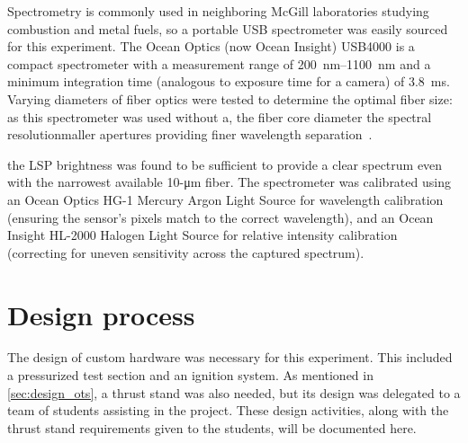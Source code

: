                 Spectrometry is commonly used in neighboring McGill laboratories studying combustion and metal fuels, so a portable USB spectrometer was easily sourced for this experiment. The Ocean Optics (now Ocean Insight) USB4000 \cite{oceanopticsUSB4000FiberOptic2008} is a compact spectrometer with a measurement range of \qtyrange{200}{1100}{nm} and a minimum integration time (analogous to exposure time for a camera) of 3.8~ms.  Varying diameters of fiber optics were tested to determine the optimal fiber size: as this spectrometer was used without a, the fiber core diameter  the spectral resolutionmaller apertures  providing finer wavelength separation~\cite{naveDiffractionGratingResolution2000}. 
                
                 the LSP brightness was found to be sufficient to provide a clear spectrum even with the narrowest available 10-\unit{\um} fiber. The spectrometer was calibrated using an Ocean Optics HG-1 Mercury Argon Light Source for wavelength calibration (ensuring the sensor's pixels match to the correct wavelength), and an Ocean Insight HL-2000 Halogen Light Source for relative intensity calibration (correcting for uneven sensitivity across the captured spectrum).

    \section{Design process}
        The design of custom hardware was necessary for this experiment. This included a pressurized test section and an ignition system. As mentioned in \autoref{sec:design_ots}, a thrust stand was also needed, but its design was delegated to a team of students assisting in the project. These design activities, along with the thrust stand requirements given to the students, will be documented here.

